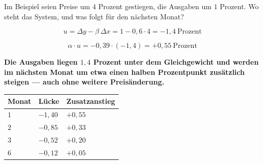 \begin{aufgabe}
Im Beispiel seien Preise um $4$ Prozent gestiegen, die Ausgaben um $1$ Prozent. Wo steht das System, und was folgt für den nächsten Monat?

\loesung
{}
\[ u = \Delta y - \beta\,\Delta x = 1 - 0{,}6\cdot4 = -1{,}4 \ \text{Prozent} \]

\[ \alpha\cdot u = -0{,}39\cdot(-1{,}4) = +0{,}55 \ \text{Prozent} \]

\begin{center}
\begin{minipage}{0.9\textwidth}
\textbf{Die Ausgaben liegen $1{,}4$ Prozent unter dem Gleichgewicht und werden im nächsten Monat um etwa einen halben Prozentpunkt zusätzlich steigen --- auch ohne weitere Preisänderung.}
\end{minipage}
\end{center}

\begin{center}
{\small
\renewcommand{\arraystretch}{1.48}
\begin{tabular}{@{}P{1.6cm}P{2.6cm}P{2.6cm}@{}}
\toprule
\textbf{Monat} & \textbf{Lücke} & \textbf{Zusatzanstieg}\\
\midrule
$1$ & $-1{,}40$ & $+0{,}55$\\
$2$ & $-0{,}85$ & $+0{,}33$\\
$3$ & $-0{,}52$ & $+0{,}20$\\
$6$ & $-0{,}12$ & $+0{,}05$\\
\bottomrule
\end{tabular}}
\end{center}

\begin{center}
\begin{minipage}{0.88\textwidth}
\end{minipage}
\end{center}
\end{aufgabe}

